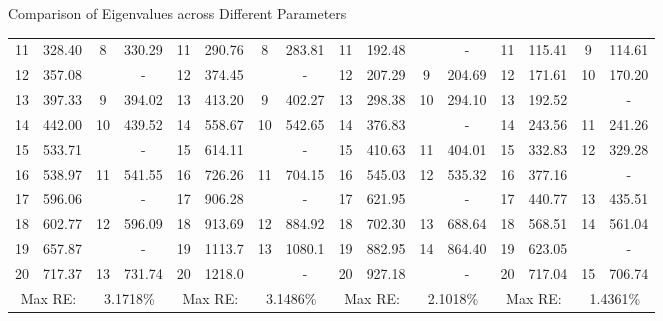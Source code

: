 \documentclass{beamer}
\begin{document}
\begin{frame}{Comparison of Eigenvalues across Different Parameters}
{\begin{tabular}{|cccc||cccc||cccc||cccc|}
		{11} & 328.40 & 8     & 330.29 & 11    & 290.76 & 8     & 283.81 & {11}    & {192.48} &       & {-} & 11    & 115.41 & 9     & 114.61 \\
		{12} & {357.08} &       & {-} & {12}    & {374.45} &       & {-} & 12    & 207.29 & 9     & 204.69 & 12    & 171.61 & 10    & 170.20 \\
		{13} & 397.33 & 9     & 394.02 & 13    & 413.20 & 9     & 402.27 & 13    & 298.38 & 10    & 294.10 & {13}    & {192.52} &       & {-} \\
		{14} & 442.00   & 10    & 439.52 & 14    & 558.67 & 10    & 542.65 & {14}    & {376.83} &       & {-} & 14    & 243.56 & 11    & 241.26 \\
		{15} & {533.71} &       & {-} & {15}    & {614.11} &       & {-} & 15    & 410.63 & 11    & 404.01 & 15    & 332.83 & 12    & 329.28 \\
		{16} & 538.97 & 11    & 541.55 & 16    & 726.26 & 11    & 704.15 & 16    & 545.03 & 12    & 535.32 & {16}    & {377.16} &       & {-} \\
		{17} & {596.06} &       & {-} & {17}    & {906.28} &       & {-} & {17}    & {621.95} &       & {-} & 17    & 440.77 & 13    & 435.51 \\
		{18} & 602.77 & 12    & 596.09 & 18    & 913.69 & 12    & 884.92 & 18    & 702.30 & 13    & 688.64 & 18    & 568.51 & 14    & 561.04 \\
		{19} & {657.87} &       & {-} & 19    & 1113.7 & 13    & 1080.1 & 19    & 882.95 & 14    & 864.40 & {19}    & {623.05} &       & {-} \\
		{20} & 717.37 & 13    & 731.74 & {20}    & {1218.0}  &       & {-} & {20}    & {927.18} &       & {-} & 20    & 717.04 & 15    & 706.74 \\
        \hline
        \multicolumn{2}{|c}{Max RE:} & \multicolumn{2}{c||}{3.1718\%} & \multicolumn{2}{c}{Max RE:} & \multicolumn{2}{c||}{3.1486\%} & \multicolumn{2}{c}{Max RE:} & \multicolumn{2}{c||}{2.1018\%} & \multicolumn{2}{c}{Max RE:} & \multicolumn{2}{c|}{1.4361\%} \\
        \hline
    \end{tabular}}
\end{frame}
\end{document}

